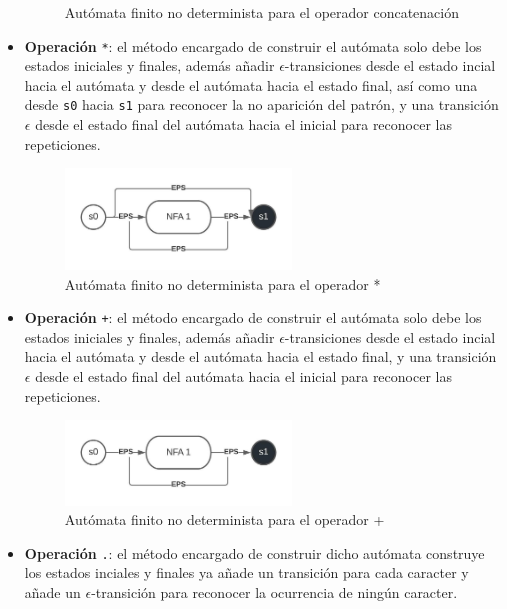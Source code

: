 \begin{itemize}
\begin{figure}
                        \caption{Autómata finito no determinista para el operador concatenación}
                \end{figure}
        \item \textbf{Operación} \verb|*|: el método encargado de construir el autómata solo debe los estados iniciales y finales, además añadir $\epsilon$-transiciones desde el estado incial hacia el autómata y desde el autómata hacia el estado final, así como una desde \verb|s0| hacia \verb|s1| para reconocer la no aparición del patrón, y una transición $\epsilon$ desde el estado final del autómata hacia el inicial para reconocer las repeticiones.
                \begin{figure}
                        \centering
                        \includegraphics[width=6cm]{./chapters/img/star.jpeg}
                        \caption{Autómata finito no determinista para el operador *}
                \end{figure}
        \item \textbf{Operación} \verb|+|: el método encargado de construir el autómata solo debe los estados iniciales y finales, además añadir $\epsilon$-transiciones desde el estado incial hacia el autómata y desde el autómata hacia el estado final, y una transición $\epsilon$ desde el estado final del autómata hacia el inicial para reconocer las repeticiones.
                \begin{figure}
                        \centering
                        \includegraphics[width=6cm]{./chapters/img/plus.jpeg}
                        \caption{Autómata finito no determinista para el operador +}
                \end{figure}
        \item \textbf{Operación} \verb|.|: el método encargado de construir dicho autómata construye los estados inciales y finales ya añade un transición para cada caracter y añade un $\epsilon$-transición para reconocer la ocurrencia de ningún caracter.

\end{itemize}
